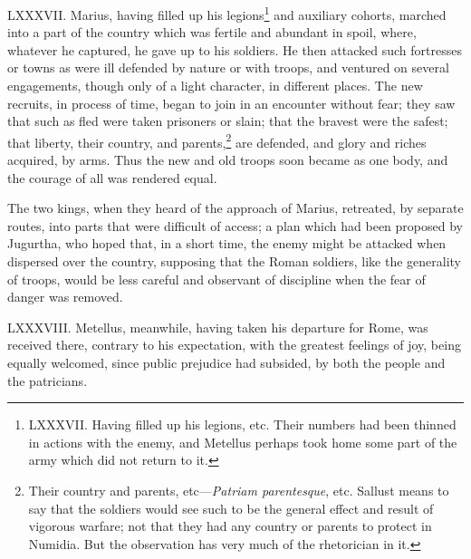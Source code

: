 LXXXVII. Marius, having filled up his legions\footnote{LXXXVII. Having filled up his legions, etc. Their numbers had been
thinned in actions with the enemy, and Metellus perhaps took home some
part of the army which did not return to it.} and auxiliary
cohorts, marched into a part of the country which was fertile and
abundant in spoil, where, whatever he captured, he gave up to his
soldiers. He then attacked such fortresses or towns as were ill
defended by nature or with troops, and ventured on several
engagements, though only of a light character, in different places.
The new recruits, in process of time, began to join in an encounter
without fear; they saw that such as fled were taken prisoners or
slain; that the bravest were the safest; that liberty, their country,
and parents,\footnote{Their country and parents, etc—\emph{Patriam parentesque}, etc.
Sallust means to say that the soldiers would see such to be the general
effect and result of vigorous warfare; not that they had any country or
parents to protect in Numidia. But the observation has very much of the
rhetorician in it.} are defended, and glory and riches acquired, by
arms. Thus the new and old troops soon became as one body, and the
courage of all was rendered equal.

The two kings, when they heard of the approach of Marius, retreated,
by separate routes, into parts that were difficult of access; a plan
which had been proposed by Jugurtha, who hoped that, in a short time,
the enemy might be attacked when dispersed over the country, supposing
that the Roman soldiers, like the generality of troops, would be less
careful and observant of discipline when the fear of danger was removed.

LXXXVIII. Metellus, meanwhile, having taken his departure for Rome,
was received there, contrary to his expectation, with the greatest
feelings of joy, being equally welcomed, since public prejudice had
subsided, by both the people and the patricians.

